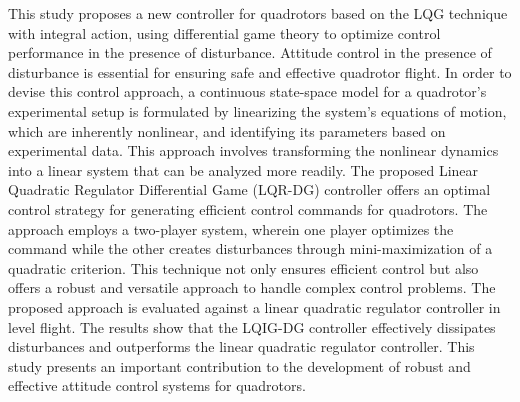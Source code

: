 \documentclass[3p,times]{elsarticle}
\begin{document}
This study proposes a new controller for quadrotors based on the LQG technique with integral action, using differential game theory to optimize control performance in the presence of disturbance. Attitude control in the presence of disturbance is essential for ensuring safe and effective quadrotor flight.
In order to devise this control approach, a continuous state-space model for a quadrotor's experimental setup is formulated by linearizing the system's equations of motion, which are inherently nonlinear, and identifying its parameters based on experimental data. This approach involves transforming the nonlinear dynamics into a linear system that can be analyzed more readily.
The proposed Linear Quadratic Regulator Differential Game (LQR-DG) controller offers an optimal control strategy for generating efficient control commands for quadrotors. The approach employs a two-player system, wherein one player optimizes the command while the other creates disturbances through mini-maximization of a quadratic criterion. This technique not only ensures efficient control but also offers a robust and versatile approach to handle complex control problems.
   The proposed approach is evaluated against a linear quadratic regulator controller in level flight. The results show that the LQIG-DG controller effectively dissipates disturbances and outperforms the linear quadratic regulator controller. This study presents an important contribution to the development of robust and effective attitude control systems for quadrotors.
\end{document}

